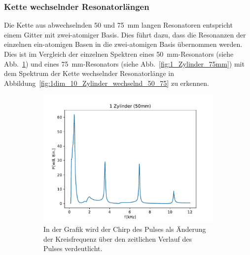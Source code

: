         \subsubsection*{Kette wechselnder Resonatorlängen}
            Die Kette aus abwechselnden 50 und \SI{75}{\milli\metre} langen Resonatoren entspricht einem Gitter mit zwei-atomiger Basis. Dies führt dazu, dass die Resonanzen der einzelnen ein-atomigen Basen
            in die zwei-atomigen Basis  übernommen werden. Dies ist im Vergleich der einzelnen Spektren eines \SI{50}{\milli\metre}-Resonators (siehe Abb.~\ref{fig:1_Zylinder_50mm}) und eines 
            \SI{75}{\milli\metre}-Resonators (siehe Abb.~\ref{fig:1_Zylinder_75mm}) mit dem Spektrum der Kette wechselnder Resonatorlänge in Abbildung~\ref{fig:1dim_10_Zylinder_wechselnd_50_75} zu erkennen.
            \FloatBarrier
            \begin{figure}[ht]
                \centering
                \begin{subfigure}[b]{0.45\textwidth}
                    \centering
                    \includegraphics[scale=0.45]{./pictures/1_Zylinder_50mm.pdf}
                    \caption{In der Grafik wird der Chirp des Pulses als Änderung der Kreisfrequenz über den zeitlichen Verlauf des Pulses verdeutlicht.}
                    \label{fig:1_Zylinder_50mm}
                \end{subfigure}
                \hfill
                \centering
                \begin{subfigure}[b]{0.45\textwidth}
                    \centering

\end{subfigure}
\end{figure}
